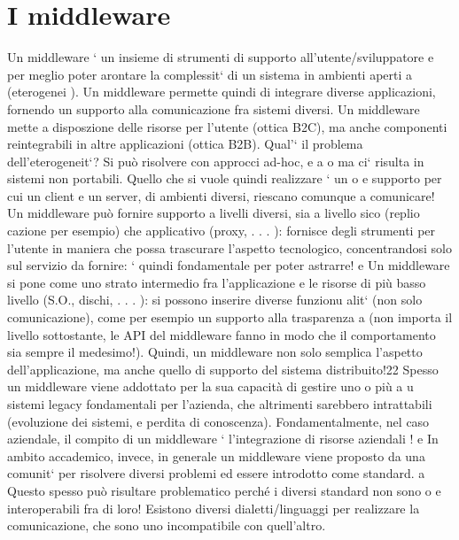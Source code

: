\documentclass[a4paper,12pt]{article}
\begin{document}
\section{I middleware}
Un middleware ` un insieme di strumenti di supporto all'utente/sviluppatore
e
per meglio poter arontare la complessit` di un sistema in ambienti aperti
a
(eterogenei ). Un middleware permette quindi di integrare diverse applicazioni,
fornendo un supporto alla comunicazione fra sistemi diversi.
Un middleware mette a disposzione delle risorse per l'utente (ottica B2C),
ma anche componenti reintegrabili in altre applicazioni (ottica B2B).
Qual'` il problema dell'eterogeneit`? Si può risolvere con approcci ad-hoc,
e
a
o
ma ci` risulta in sistemi non portabili. Quello che si vuole quindi realizzare ` un
o
e
supporto per cui un client e un server, di ambienti diversi, riescano comunque
a comunicare!
Un middleware può fornire supporto a livelli diversi, sia a livello sico (replio
cazione per esempio) che applicativo (proxy, . . . ): fornisce degli strumenti per
l'utente in maniera che possa trascurare l'aspetto tecnologico, concentrandosi
solo sul servizio da fornire: ` quindi fondamentale per poter astrarre!
e
Un middleware si pone come uno strato intermedio fra l'applicazione e le
risorse di più basso livello (S.O., dischi, . . . ): si possono inserire diverse funzionu
alit` (non solo comunicazione), come per esempio un supporto alla trasparenza
a
(non importa il livello sottostante, le API del middleware fanno in modo che
il comportamento sia sempre il medesimo!). Quindi, un middleware non solo
semplica l'aspetto dell'applicazione, ma anche quello di supporto del sistema
distribuito!22
Spesso un middleware viene addottato per la sua capacità di gestire uno o più
a
u
sistemi legacy fondamentali per l'azienda, che altrimenti sarebbero intrattabili
(evoluzione dei sistemi, e perdita di conoscenza). Fondamentalmente, nel caso
aziendale, il compito di un middleware ` l'integrazione di risorse aziendali !
e
In ambito accademico, invece, in generale un middleware viene proposto da
una comunit` per risolvere diversi problemi ed essere introdotto come standard.
a
Questo spesso può risultare problematico perché i diversi standard non sono
o
e
interoperabili fra di loro! Esistono diversi dialetti/linguaggi per realizzare la
comunicazione, che sono uno incompatibile con quell'altro.
\end{document}
